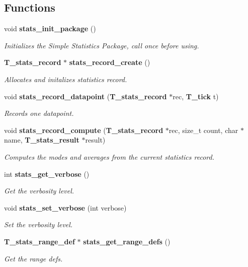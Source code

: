 \subsection*{Functions}
\begin{CompactItemize}
\item 
void {\bf stats\_\-init\_\-package} ()
\begin{CompactList}\small\item\em Initializes the Simple Statistics Package, call once before using.\item\end{CompactList}\item 
{\bf T\_\-stats\_\-record} $\ast$ {\bf stats\_\-record\_\-create} ()
\begin{CompactList}\small\item\em Allocates and initalizes statistics record.\item\end{CompactList}\item 
void {\bf stats\_\-record\_\-datapoint} ({\bf T\_\-stats\_\-record} $\ast$rec, {\bf T\_\-tick} t)
\begin{CompactList}\small\item\em Records one datapoint.\item\end{CompactList}\item 
void {\bf stats\_\-record\_\-compute} ({\bf T\_\-stats\_\-record} $\ast$rec, size\_\-t count, char $\ast$name, {\bf T\_\-stats\_\-result} $\ast$result)
\begin{CompactList}\small\item\em Computes the modes and averages from the current statistics record.\item\end{CompactList}\item 
int {\bf stats\_\-get\_\-verbose} ()
\begin{CompactList}\small\item\em Get the verbosity level.\item\end{CompactList}\item 
void {\bf stats\_\-set\_\-verbose} (int verbose)
\begin{CompactList}\small\item\em Set the verbosity level.\item\end{CompactList}\item 
{\bf T\_\-stats\_\-range\_\-def} $\ast$ {\bf stats\_\-get\_\-range\_\-defs} ()
\begin{CompactList}\small\item\em Get the range defs.\item\end{CompactList}\end{CompactItemize}


